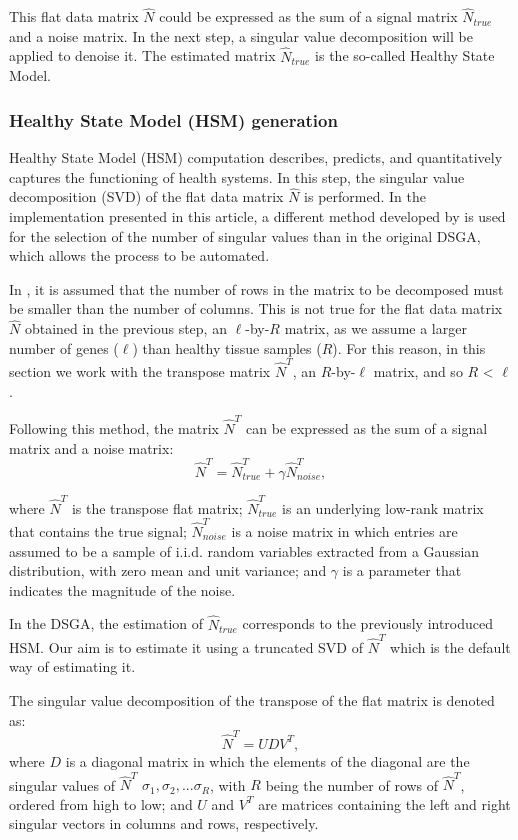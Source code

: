 This flat data matrix \(\hat{N}\) could be expressed as the sum of a signal matrix \(\hat{N}_{true}\) and a noise matrix. In the next step, a singular value decomposition will be applied to denoise it. The estimated matrix \(\hat{N}_{true}\) is the so-called Healthy State Model.

\hypertarget{section2.1.2}{%
\subsubsection{Healthy State Model (HSM) generation}\label{section2.1.2}}

Healthy State Model (HSM) computation describes, predicts, and quantitatively captures the functioning of health systems. In this step, the singular value decomposition (SVD) of the flat data matrix \(\hat{N}\) is performed. In the implementation presented in this article, a different method developed by \citet{gavish2014optimal} is used for the selection of the number of singular values than in the original DSGA, which allows the process to be automated.

In \citet{gavish2014optimal}, it is assumed that the number of rows in the matrix to be decomposed must be smaller than the number of columns. This is not true for the flat data matrix \(\hat{N}\) obtained in the previous step, an \(\ell\)-by-\(R\) matrix, as we assume a larger number of genes (\(\ell\)) than healthy tissue samples (\(R\)). For this reason, in this section we work with the transpose matrix \(\hat{N}^T\), an \(R\)-by-\(\ell\) matrix, and so \(R\) \textless{} \(\ell\).

Following this method, the matrix \(\hat{N}^T\) can be expressed as the sum of a signal matrix and a noise matrix:
\[\hat{N}^T = \hat{N}_{true}^T + \gamma \hat{N}_{noise}^T,\]

where \(\hat{N}^T\) is the transpose flat matrix; \(\hat{N}_{true}^T\) is an underlying low-rank matrix that contains the true signal; \(\hat{N}_{noise}^T\) is a noise matrix in which entries are assumed to be a sample of i.i.d. random variables extracted from a Gaussian distribution, with zero mean and unit variance; and \(\gamma\) is a parameter that indicates the magnitude of the noise.

In the DSGA, the estimation of \(\hat{N}_{true}\) corresponds to the previously introduced HSM. Our aim is to estimate it using a truncated SVD of \(\hat{N}^T\) which is the default way of estimating it.

The singular value decomposition of the transpose of the flat matrix is denoted as:
\[\hat{N}^T = U  D  V^T,\]
where \(D\) is a diagonal matrix in which the elements of the diagonal are the singular values of \(\hat{N}^T\) \(\sigma_{1}, \sigma_{2},... \sigma_{R}\), with \(R\) being the number of rows of \(\hat{N}^T\), ordered from high to low; and \(U\) and \(V^T\) are matrices containing the left and right singular vectors in columns and rows, respectively.

